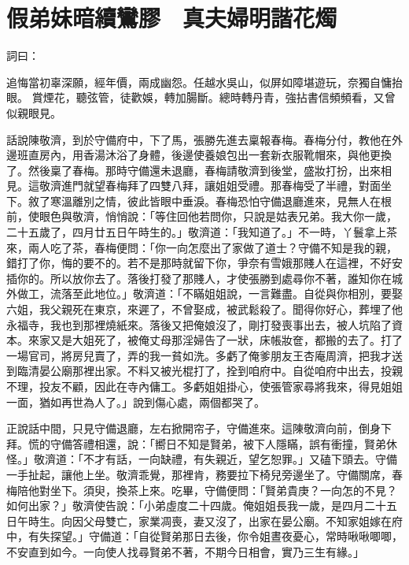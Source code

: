 %

\chapter{假弟妹暗續鸞膠　真夫婦明諧花燭}

\begin{showcontents}{}


詞曰：

追悔當初辜深願，經年價，兩成幽怨。任越水吳山，似屏如障堪遊玩，奈獨自慵抬眼。
賞煙花，聽弦管，徒歡娛，轉加腸斷。總時轉丹青，強拈書信頻頻看，又曾似親眼見。

話說陳敬濟，到於守備府中，下了馬，張勝先進去稟報春梅。春梅分付，教他在外邊班直房內，用香湯沐浴了身體，後邊使養娘包出一套新衣服靴帽來，與他更換了。然後稟了春梅。那時守備還未退廳，春梅請敬濟到後堂，盛妝打扮，出來相見。這敬濟進門就望春梅拜了四雙八拜，讓姐姐受禮。那春梅受了半禮，對面坐下。敘了寒溫離別之情，彼此皆眼中垂淚。春梅恐怕守備退廳進來，見無人在根前，使眼色與敬濟，悄悄說：「等住回他若問你，只說是姑表兄弟。我大你一歲，二十五歲了，四月廿五日午時生的。」敬濟道：「我知道了。」不一時，丫鬟拿上茶來，兩人吃了茶，春梅便問：「你一向怎麼出了家做了道士？守備不知是我的親，錯打了你，悔的要不的。若不是那時就留下你，爭奈有雪娥那賤人在這裡，不好安插你的。所以放你去了。落後打發了那賤人，才使張勝到處尋你不著，誰知你在城外做工，流落至此地位。」敬濟道：「不瞞姐姐說，一言難盡。自從與你相別，要娶六姐，我父親死在東京，來遲了，不曾娶成，被武鬆殺了。聞得你好心，葬埋了他永福寺，我也到那裡燒紙來。落後又把俺娘沒了，剛打發喪事出去，被人坑陷了資本。來家又是大姐死了，被俺丈母那淫婦告了一狀，床帳妝奩，都搬的去了。打了一場官司，將房兒賣了，弄的我一貧如洗。多虧了俺爹朋友王杏庵周濟，把我才送到臨清晏公廟那裡出家。不料又被光棍打了，拴到咱府中。自從咱府中出去，投親不理，投友不顧，因此在寺內傭工。多虧姐姐掛心，使張管家尋將我來，得見姐姐一面，猶如再世為人了。」說到傷心處，兩個都哭了。

正說話中間，只見守備退廳，左右掀開帘子，守備進來。這陳敬濟向前，倒身下拜。慌的守備答禮相還，說：「嚮日不知是賢弟，被下人隱瞞，誤有衝撞，賢弟休怪。」敬濟道：「不才有話，一向缺禮，有失親近，望乞恕罪。」又磕下頭去。守備一手扯起，讓他上坐。敬濟乖覺，那裡肯，務要拉下椅兒旁邊坐了。守備關席，春梅陪他對坐下。須臾，換茶上來。吃畢，守備便問：「賢弟貴庚？一向怎的不見？如何出家？」敬濟使告說：「小弟虛度二十四歲。俺姐姐長我一歲，是四月二十五日午時生。向因父母雙亡，家業凋喪，妻又沒了，出家在晏公廟。不知家姐嫁在府中，有失探望。」守備道：「自從賢弟那日去後，你令姐晝夜憂心，常時啾啾唧唧，不安直到如今。一向使人找尋賢弟不著，不期今日相會，實乃三生有緣。」


\end{showcontents}
